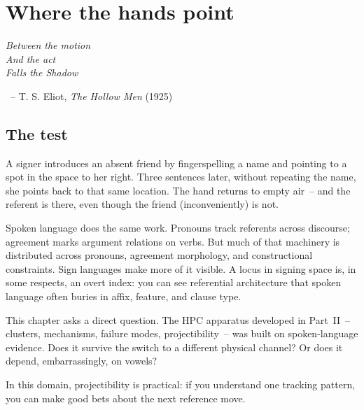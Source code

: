\chapter{Where the hands point}
\label{ch:sign-anaphor}

\epigraph{\textit{Between the motion\\And the act\\Falls the Shadow}}{~-- T. S. Eliot, \textit{The Hollow Men} (1925)}


\section{The test}
\label{sec:sign:test}

A signer introduces an absent friend by fingerspelling a name and pointing to a spot in the space to her right. Three sentences later, without repeating the name, she points back to that same location. The hand returns to empty air~-- and the referent is there, even though the friend (inconveniently) is not.

Spoken language does the same work. Pronouns track referents across discourse; agreement marks argument relations on verbs. But much of that machinery is distributed across pronouns, agreement morphology, and constructional constraints. Sign languages make more of it visible. A locus in signing space is, in some respects, an overt index: you can see referential architecture that spoken language often buries in affix, feature, and clause type.

This chapter asks a direct question. The HPC apparatus developed in Part~II~-- clusters, mechanisms, failure modes, projectibility~-- was built on spoken-language evidence. Does it survive the switch to a different physical channel? Or does it depend, embarrassingly, on vowels?

In this domain, projectibility is practical: if you understand one tracking pattern, you can make good bets about the next reference move.

